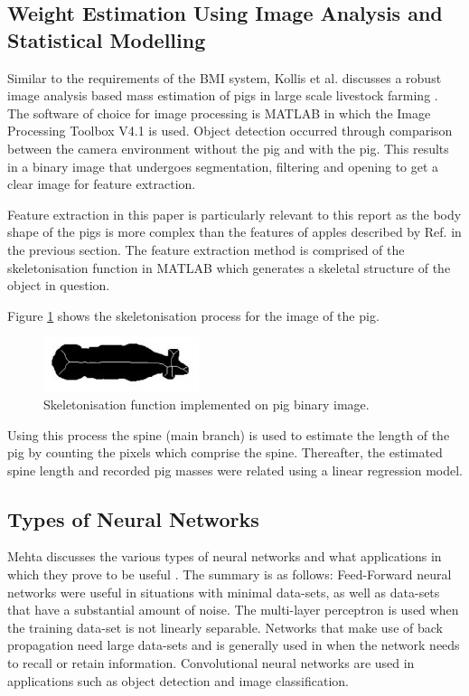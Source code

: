 \documentclass[conference]{IEEEtran}
\begin{document}
\subsection{Weight Estimation Using Image Analysis and Statistical Modelling}
Similar to the requirements of the BMI system, Kollis et al. discusses a robust image analysis based mass estimation of pigs in large scale livestock farming \cite{kollis2007weight}. 
The software of choice for image processing is MATLAB in which the Image Processing Toolbox V4.1 is used.
Object detection occurred through comparison between the camera environment without the pig and with the pig.
This results in a binary image that undergoes segmentation, filtering and opening to get a clear image for feature extraction.

Feature extraction in this paper is particularly relevant to this report as the body shape of the pigs is more complex than the features of apples described by Ref. \cite{comert} in the previous section. 
The feature extraction method is comprised of the skeletonisation function in MATLAB which generates a skeletal structure of the object in question.

Figure \ref{fig:pigskeleton} shows the skeletonisation process for the image of the pig.
\begin{figure}
    \centering
    \includegraphics[width=\linewidth]{pigskeleton.jpg}
    \caption{Skeletonisation function implemented on pig binary image\cite{kollis2007weight}.}
    \label{fig:pigskeleton}
\end{figure}

Using this process the spine (main branch) is used to estimate the length of the pig by counting the pixels which comprise the spine.
Thereafter, the estimated spine length and recorded pig masses were related using a linear regression model.

\subsection{Types of Neural Networks}
Mehta discusses the various types of neural networks and what applications in which they prove to be useful \cite{mehta_2019}. 
The summary is as follows:
Feed-Forward neural networks were useful in situations with minimal data-sets, as well as data-sets that have a substantial amount of noise.
The multi-layer perceptron is used when the training data-set is not linearly separable.
Networks that make use of back propagation need large data-sets and is generally used in when the network needs to recall or retain information.
Convolutional neural networks are used in applications such as object detection and image classification.
\end{document}
